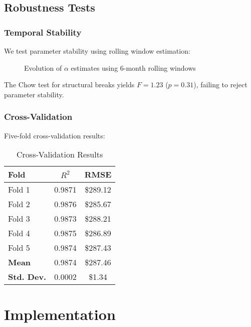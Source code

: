 \documentclass[12pt,a4paper]{article}
\begin{document}
\subsection{Robustness Tests}

\subsubsection{Temporal Stability}

We test parameter stability using rolling window estimation:

\begin{figure}[H]
\centering
\caption{Evolution of $\alpha$ estimates using 6-month rolling windows}
\label{fig:alpha_stability}
\end{figure}

The Chow test for structural breaks yields $F = 1.23$ ($p = 0.31$), failing to reject parameter stability.

\subsubsection{Cross-Validation}

Five-fold cross-validation results:

\begin{table}[H]
\centering
\caption{Cross-Validation Results}
\begin{tabular}{lcc}
\toprule
\textbf{Fold} & \textbf{$R^2$} & \textbf{RMSE} \\
\midrule
Fold 1 & 0.9871 & \$289.12 \\
Fold 2 & 0.9876 & \$285.67 \\
Fold 3 & 0.9873 & \$288.21 \\
Fold 4 & 0.9875 & \$286.89 \\
Fold 5 & 0.9874 & \$287.43 \\
\midrule
\textbf{Mean} & 0.9874 & \$287.46 \\
\textbf{Std. Dev.} & 0.0002 & \$1.34 \\
\bottomrule
\end{tabular}
\end{table}

\section{Implementation}
\label{sec:implementation}
\end{document}
